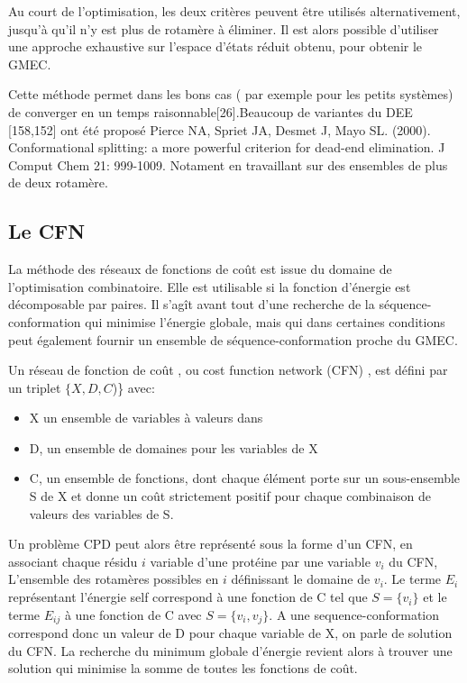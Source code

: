 Au court de l'optimisation, les deux critères peuvent être utilisés alternativement, jusqu'à qu'il n'y est plus de rotamère à éliminer. Il est alors possible d'utiliser une approche exhaustive sur l'espace d'états réduit obtenu, pour obtenir le GMEC.

Cette méthode permet dans les bons cas ( par exemple pour les petits systèmes) de converger en un temps raisonnable[26].Beaucoup de variantes du DEE [158,152] ont été proposé Pierce NA, Spriet JA, Desmet J, Mayo SL. (2000). Conformational splitting: a more powerful criterion for dead-end elimination. J Comput Chem 21: 999-1009. Notament en travaillant sur des ensembles de plus de deux rotamère.


\subsection{Le CFN}

La méthode des réseaux de fonctions de coût est issue du domaine de l'optimisation combinatoire. Elle est utilisable si la fonction d'énergie est décomposable par paires.
Il s'agît avant tout d'une recherche de la séquence-conformation qui minimise l'énergie globale, mais qui dans certaines conditions peut également fournir un ensemble de séquence-conformation proche du GMEC.

Un réseau de fonction de coût , ou cost function network (CFN) , est défini par un triplet $\{X,D,C$)\} avec:

\begin{itemize}
\item X un ensemble de variables à valeurs dans 
\item D, un ensemble de domaines pour les variables de X
 \item C, un ensemble de fonctions, dont chaque élément porte sur un sous-ensemble S de X et donne un coût strictement positif pour chaque combinaison de valeurs des variables de S.

\end{itemize}  


Un problème CPD peut alors être représenté sous la forme d'un CFN, en associant chaque résidu $i$ variable d'une protéine par une variable $v_i$ du CFN, L'ensemble des rotamères possibles en $i$ définissant le domaine de $v_i$. Le terme $E_i$ représentant l'énergie \og self \fg correspond à une fonction de C tel que $S=\{v_i\}$ et le terme $E_{ij}$ à une fonction de C avec $S=\{v_i,v_j\}$. A une sequence-conformation correspond donc un valeur de D pour chaque variable de X, on parle de solution du CFN. La recherche du minimum globale d'énergie revient alors à trouver une solution qui minimise la somme de toutes les fonctions de coût.

